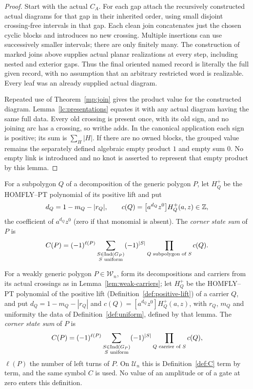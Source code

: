 \begin{proof}
Start with the actual $C_A$. For each gap attach the recursively
constructed actual diagrams for that gap in their inherited order,
using small disjoint crossing-free intervals in that gap. Each clean
join concatenates just the chosen cyclic blocks and introduces no new
crossing. Multiple insertions can use successively smaller intervals;
there are only finitely many. The construction of marked joins above
supplies actual planar realizations at every step, including nested
and exterior gaps. Thus the final oriented named record is literally
the full given record, with no assumption that an arbitrary restricted
word is realizable. Every leaf was an already supplied actual diagram.

Repeated use of Theorem~\ref{mp:join} gives the product value for the
constructed diagram. Lemma~\ref{lc:presentations} equates it with any actual
diagram having the same full data. Every old crossing is present once,
with its old sign, and no joining arc has a crossing, so writhe adds.
In the canonical application each sign is positive; its sum is
$\sum_H|H|$. If there are no owned blocks, the grouped value remains
the separately defined algebraic empty product $1$ and empty sum $0$.
No empty link is introduced and no knot is asserted to represent that
empty product by this lemma.
\end{proof}



\begin{definition}\label{def:C}
For a subpolygon $Q$ of a decomposition of the generic polygon $P$, let
$H^+_Q$ be the HOMFLY--PT polynomial of its positive lift and put
\[
d_Q=1-m_Q-|r_Q|,\qquad c(Q)=\bigl[a^{d_Q}z^0\bigr]H^+_Q(a,z)\in\mathbb Z,
\]
the coefficient of $a^{d_Q}z^0$ (zero if that monomial is absent). The
\emph{corner state sum} of $P$ is
\[
C(P)=(-1)^{\ell(P)}\sum_{\substack{S\in\operatorname{Ind}(G_P)\\ S\text{ uniform}}}
(-1)^{|S|}\prod_{Q\text{ subpolygon of }S}c(Q).
\]
\end{definition}

\begin{definition}\label{def:C-weak}
For a weakly generic polygon $P\in\mathcal W_n$, form its decompositions
and carriers from its actual crossings as in
Lemma~\ref{lem:weak-carriers}; let $H^+_Q$ be the HOMFLY--PT polynomial of
the positive lift (Definition~\ref{def:positive-lift}) of a carrier $Q$,
and put $d_Q=1-m_Q-|r_Q|$ and $c(Q)=[a^{d_Q}z^0]H^+_Q(a,z)$, with $r_Q$,
$m_Q$ and uniformity the data of Definition~\ref{def:uniform}, defined by
that lemma. The \emph{corner state sum} of $P$ is
\[
C(P)=(-1)^{\ell(P)}\sum_{\substack{S\in\operatorname{Ind}(G_P)\\ S\text{ uniform}}}
(-1)^{|S|}\prod_{Q\text{ carrier of }S}c(Q),
\]
$\ell(P)$ the number of left turns of $P$. On $\mathcal U_n$ this is
Definition~\ref{def:C} term by term, and the same symbol $C$ is used. No
value of an amplitude or of a gate at zero enters this definition.
\end{definition}

